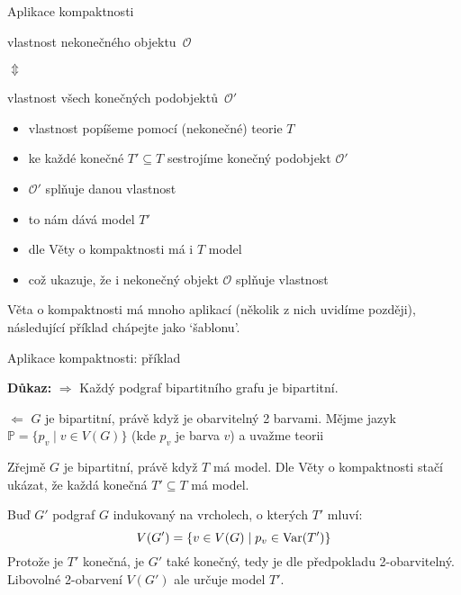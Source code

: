 \documentclass{beamer}
\begin{document}
\begin{frame}{Aplikace kompaktnosti}
     
    \begin{center}
        \alert{vlastnost nekonečného objektu~$\mathcal O$}
    
        $\Updownarrow$

        \alert{vlastnost všech konečných podobjektů~$\mathcal O'$}
    \end{center}
    
    \pause
    \begin{itemize}
        \item vlastnost popíšeme pomocí (nekonečné) teorie $T$\pause
        \item ke každé konečné $T'\subseteq T$ sestrojíme konečný podobjekt $\mathcal O'$\pause
        \item $\mathcal O'$ splňuje danou vlastnost\pause
        \item to nám dává model $T'$\pause
        \item dle Věty o kompaktnosti má i $T$ model\pause
        \item což ukazuje, že i nekonečný objekt $\mathcal O$ splňuje vlastnost
    \end{itemize}
     
    \pause
    Věta o kompaktnosti má mnoho aplikací (několik z nich uvidíme později), následující příklad chápejte jako `šablonu'.

\end{frame}


\begin{frame}{Aplikace kompaktnosti: příklad}


    \pause
    \textbf{Důkaz:} \alert{$\Rightarrow$} Každý podgraf bipartitního grafu je bipartitní. 
    
    \pause
    \alert{$\Leftarrow$} $G$ je bipartitní, právě když je obarvitelný 2 barvami. \pause Mějme jazyk $\mathbb P=\{p_v\mid v\in V(G)\}$ (kde $p_v$ je barva $v$) a uvažme teorii
    

    \pause
    Zřejmě $G$ je bipartitní, právě když $T$ má model. Dle Věty o kompaktnosti stačí ukázat, že každá konečná $T'\subseteq T$ má model.
    
    \pause
    Buď $G'$ podgraf $G$ indukovaný na vrcholech, o kterých $T'$ mluví:
    $$
    V(G')=\{v\in V(G)\mid p_v\in\operatorname{Var}(T')\}
    $$
    \pause
    Protože je $T'$ konečná, je $G'$ také konečný, tedy je dle předpokladu 2-obarvitelný. Libovolné 2-obarvení $V(G')$ ale určuje model $T'$.\hfill\qedsymbol

\end{frame}
\end{document}
